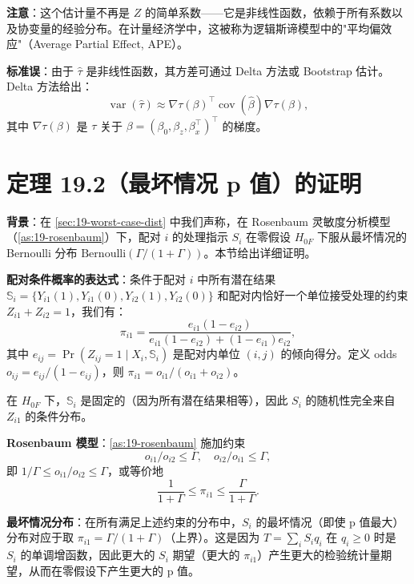 \textbf{注意}：这个估计量不再是 $Z$ 的简单系数——它是非线性函数，依赖于所有系数以及协变量的经验分布。在计量经济学中，这被称为逻辑斯谛模型中的"平均偏效应"（Average Partial Effect, APE）。

\textbf{标准误}：由于 $\hat{\tau}$ 是非线性函数，其方差可通过 Delta 方法或 Bootstrap 估计。Delta 方法给出：
\[
\operatorname{var}(\hat{\tau}) \approx \nabla \tau(\beta)^\top \operatorname{cov}(\hat\beta) \nabla \tau(\beta),
\]
其中 $\nabla \tau(\beta)$ 是 $\tau$ 关于 $\beta = (\beta_0, \beta_z, \beta_x^\top)^\top$ 的梯度。

\section{定理 19.2（最坏情况 p 值）的证明}\label{sec:appendix-19-worst-case-proof-theorem-2}

\textbf{背景}：在 \cref{sec:19-worst-case-dist} 中我们声称，在 Rosenbaum 灵敏度分析模型（\cref{as:19-rosenbaum}）下，配对 $i$ 的处理指示 $S_i$ 在零假设 $H_{0F}$ 下服从最坏情况的 Bernoulli 分布 $\mathrm{Bernoulli}(\Gamma/(1+\Gamma))$。本节给出详细证明。

\textbf{配对条件概率的表达式}：条件于配对 $i$ 中所有潜在结果 $\mathbb{S}_i = \{Y_{i1}(1), Y_{i1}(0), Y_{i2}(1), Y_{i2}(0)\}$ 和配对内恰好一个单位接受处理的约束 $Z_{i1} + Z_{i2} = 1$，我们有：
\[
\pi_{i1} = \frac{e_{i1}(1 - e_{i2})}{e_{i1}(1 - e_{i2}) + (1 - e_{i1})e_{i2}},
\]
其中 $e_{ij} = \Pr(Z_{ij} = 1 \mid X_i, \mathbb{S}_i)$ 是配对内单位 $(i,j)$ 的倾向得分。定义 odds $o_{ij} = e_{ij} / (1 - e_{ij})$，则 $\pi_{i1} = o_{i1} / (o_{i1} + o_{i2})$。

在 $H_{0F}$ 下，$\mathbb{S}_i$ 是固定的（因为所有潜在结果相等），因此 $S_i$ 的随机性完全来自 $Z_{i1}$ 的条件分布。

\textbf{Rosenbaum 模型}：\cref{as:19-rosenbaum} 施加约束
\[
o_{i1} / o_{i2} \leq \Gamma, \quad o_{i2} / o_{i1} \leq \Gamma,
\]
即 $1/\Gamma \leq o_{i1}/o_{i2} \leq \Gamma$，或等价地
\[
\frac{1}{1+\Gamma} \leq \pi_{i1} \leq \frac{\Gamma}{1+\Gamma}.
\]

\textbf{最坏情况分布}：在所有满足上述约束的分布中，$S_i$ 的最坏情况（即使 p 值最大）分布对应于取 $\pi_{i1} = \Gamma/(1+\Gamma)$（上界）。这是因为 $T = \sum_i S_i q_i$ 在 $q_i \geq 0$ 时是 $S_i$ 的单调增函数，因此更大的 $S_i$ 期望（更大的 $\pi_{i1}$）产生更大的检验统计量期望，从而在零假设下产生更大的 p 值。

